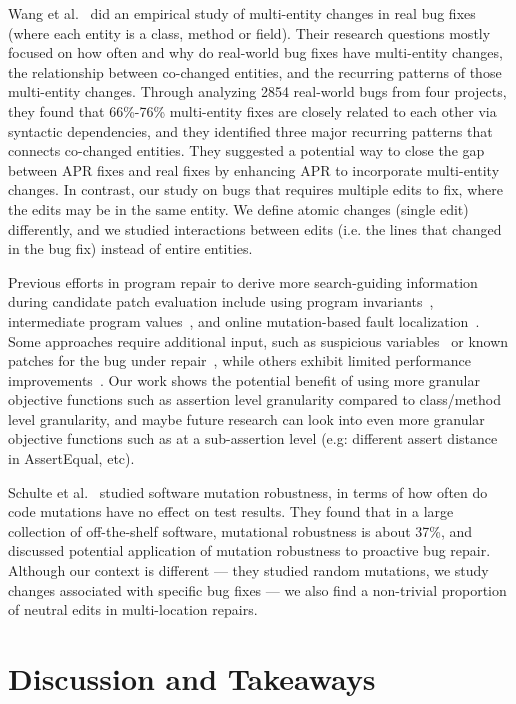 \documentclass[10pt, conference]{IEEEtran}
\begin{document}
Wang et al.~\cite{wang2018} did an empirical study of multi-entity changes in real bug fixes 
(where each entity is a class, method or field). Their research questions mostly focused on 
how often and why do real-world bug fixes have multi-entity changes, the relationship 
between co-changed entities, and the recurring patterns of those multi-entity changes. 
Through analyzing 2854 real-world bugs from four projects, they found that 66\%-76\% 
multi-entity fixes are closely related to each other via syntactic dependencies, 
and they identified three major recurring patterns that connects co-changed entities. 
They suggested a potential way to close the gap between APR fixes and real fixes by 
enhancing APR to incorporate multi-entity changes. In contrast, our study on bugs that
requires multiple edits to fix, where the edits may be in the same entity. We define atomic 
changes (single edit) differently, and we studied interactions between edits 
(i.e. the lines that changed in the bug fix) instead of entire entities.

Previous efforts in program repair to derive more search-guiding information 
during candidate patch evaluation 
include using program invariants~\cite{better-fitness, dinglyu}, 
intermediate program values~\cite{source-code-checkpoint}, 
and online mutation-based fault localization~\cite{mut-analysis}.
Some approaches require additional input, such as suspicious variables~\cite{source-code-checkpoint} 
or known patches for the bug under repair~\cite{better-fitness}, 
while others exhibit limited performance improvements~\cite{dinglyu, mut-analysis}.
Our work shows the potential benefit of using more granular objective functions such as
assertion level granularity compared to class/method level granularity, and maybe
future research can look into even more granular objective functions such as at a sub-assertion
level (e.g: different assert distance in AssertEqual, etc).

Schulte et al.~\cite{schulte} studied software mutation robustness, in terms of 
how often do code mutations have no effect on test results.
They found that in a large collection of off-the-shelf software, mutational robustness is about 37\%, 
and discussed potential application of mutation robustness to proactive bug repair. Although our context is different --- they studied random mutations, we study changes associated with specific bug fixes --- we also find a non-trivial proportion of neutral edits in multi-location repairs.  


\section{Discussion and Takeaways}
\label{sec:takeaways}
\end{document}
